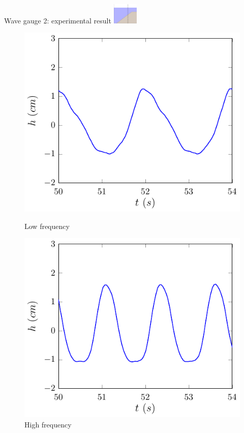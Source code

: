 \documentclass[pdf]{beamer}
\begin{document}
\begin{frame}{Wave gauge 2: experimental result \space\space	\includegraphics[width=1.2cm]{./Pics/WT2z.pdf}  }
    \begin{figure}
    	\centering
    	\begin{minipage}{.5\textwidth}
    		\centering
    		\includegraphics[width=0.9\linewidth]{./Pics/SL/WG2/1e-figure0.pdf}
    		\caption{Low frequency}
    	\end{minipage}%
    	\begin{minipage}{.5\textwidth}
    		\centering
    		\includegraphics[width=0.9\linewidth]{./Pics/SH/WG2/1e-figure0.pdf}
    		\caption{High frequency}
    	\end{minipage}
    \end{figure}
\end{frame}
\end{document}
